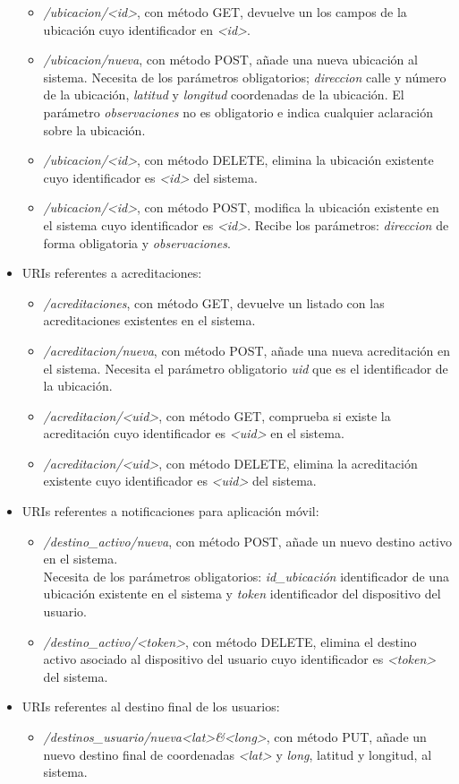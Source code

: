 \begin{itemize}
\begin{itemize}
		\item \textit{/ubicacion/<id>}, con método GET, devuelve un los campos de la ubicación cuyo identificador en \textit{<id>}.
		\item \textit{/ubicacion/nueva}, con método POST, añade una nueva ubicación al sistema. Necesita de los parámetros obligatorios; \textit{direccion} calle y número de la ubicación, \textit{latitud} y \textit{longitud} coordenadas de la ubicación. El parámetro \textit{observaciones} no es obligatorio e indica cualquier aclaración sobre la ubicación.
		\item \textit{/ubicacion/<id>}, con método DELETE, elimina la ubicación existente cuyo identificador es \textit{<id>} del sistema.
		\item \textit{/ubicacion/<id>}, con método POST, modifica la ubicación existente en el sistema cuyo identificador es \textit{<id>}. Recibe los parámetros: \textit{direccion} de forma obligatoria y \textit{observaciones}.
	\end{itemize}
	\item URIs referentes a acreditaciones:
	\begin{itemize}
		\item \textit{/acreditaciones}, con método GET, devuelve un listado con las acreditaciones existentes en el sistema.
		\item \textit{/acreditacion/nueva}, con método POST, añade una nueva acreditación en el sistema. Necesita el parámetro obligatorio \textit{uid} que es el identificador de la ubicación.
		\item \textit{/acreditacion/<uid>}, con método GET, comprueba si existe la acreditación cuyo identificador es \textit{<uid>} en el sistema.
		\item \textit{/acreditacion/<uid>}, con método DELETE, elimina la acreditación existente cuyo identificador es \textit{<uid>} del sistema.
	\end{itemize}
	\item URIs referentes a notificaciones para aplicación móvil:
	\begin{itemize}
			\item \textit{/destino\_activo/nueva}, con método POST, añade un nuevo destino activo en el sistema.\\ Necesita de los parámetros obligatorios: \textit{id\_ubicación} identificador de una ubicación existente en el sistema y \textit{token} identificador del dispositivo del usuario.
		\item \textit{/destino\_activo/<token>}, con método DELETE, elimina el destino activo asociado al dispositivo del usuario cuyo identificador es \textit{<token>} del sistema.
	\end{itemize}
	\newpage
	\item URIs referentes al destino final de los usuarios:
	\begin{itemize}
		\item \textit{/destinos\_usuario/nueva<lat>\&<long>}, con método PUT, añade un nuevo destino final de coordenadas \textit{<lat>} y \textit{long}, latitud y longitud, al sistema.
	\end{itemize}
\end{itemize}